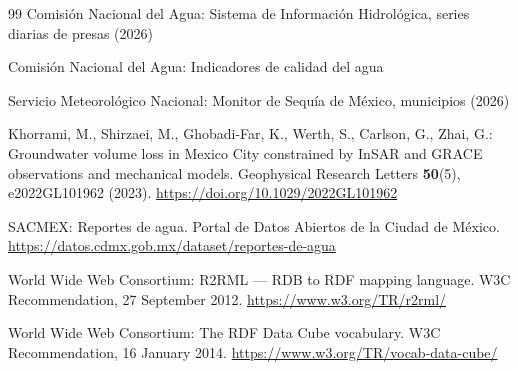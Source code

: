 \documentclass[runningheads]{llncs}
\newif\ifmarcarcambios
\newcommand{\icokg}[1]{\ifmarcarcambios\textcolor{nuevo}{#1}\else#1\fi}
\renewcommand{\_}{\origunderscore\allowbreak}
\begin{document}
\begin{thebibliography}{99}
 Comisi\'on Nacional del Agua: Sistema de Informaci\'on Hidrol\'ogica, series diarias de presas (2026)

 Comisi\'on Nacional del Agua: Indicadores de calidad del agua

 Servicio Meteorol\'ogico Nacional: Monitor de Sequ\'ia de M\'exico, municipios (2026)

 Khorrami, M., Shirzaei, M., Ghobadi-Far, K., Werth, S., Carlson, G., Zhai, G.: Groundwater volume loss in Mexico City constrained by InSAR and GRACE observations and mechanical models. Geophysical Research Letters \textbf{50}(5), e2022GL101962 (2023). \url{https://doi.org/10.1029/2022GL101962}

 SACMEX: Reportes de agua. Portal de Datos Abiertos de la Ciudad de M\'exico. \url{https://datos.cdmx.gob.mx/dataset/reportes-de-agua}

\icokg{ World Wide Web Consortium: R2RML --- RDB to RDF mapping language. W3C Recommendation, 27 September 2012. \url{https://www.w3.org/TR/r2rml/}}

\icokg{ World Wide Web Consortium: The RDF Data Cube vocabulary. W3C Recommendation, 16 January 2014. \url{https://www.w3.org/TR/vocab-data-cube/}}

\end{thebibliography}\endgroup
\end{document}

